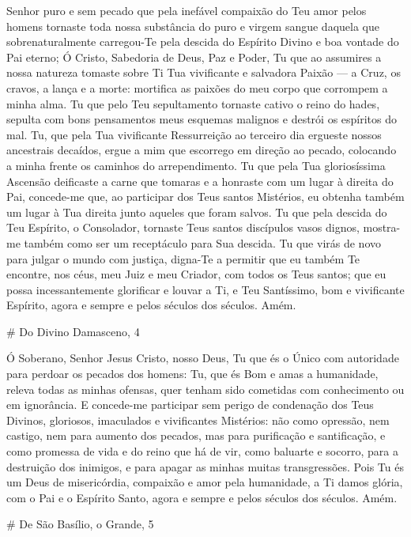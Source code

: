 \documentclass{subfiles}
\begin{document}
Senhor puro e sem pecado que pela inefável compaixão do Teu amor
pelos homens tornaste toda nossa substância do puro e virgem sangue
daquela que sobrenaturalmente carregou-Te pela descida do Espírito Divino e
boa vontade do Pai eterno; Ó Cristo, Sabedoria de Deus, Paz e Poder, Tu que
ao assumires a nossa natureza tomaste sobre Ti Tua vivificante e salvadora
Paixão — a Cruz, os cravos, a lança e a morte: mortifica as paixões do meu
corpo que corrompem a minha alma. Tu que pelo Teu sepultamento tornaste
cativo o reino do hades, sepulta com bons pensamentos meus esquemas
malignos e destrói os espíritos do mal. Tu, que pela Tua vivificante
Ressurreição ao terceiro dia ergueste nossos ancestrais decaídos, ergue a mim
que escorrego em direção ao pecado, colocando a minha frente os caminhos
do arrependimento. Tu que pela Tua gloriosíssima Ascensão deificaste a carne
que tomaras e a honraste com um lugar à direita do Pai, concede-me que, ao
participar dos Teus santos Mistérios, eu obtenha também um lugar à Tua
direita junto aqueles que foram salvos. Tu que pela descida do Teu Espírito, o
Consolador, tornaste Teus santos discípulos vasos dignos, mostra-me também
como ser um receptáculo para Sua descida. Tu que virás de novo para julgar o
mundo com justiça, digna-Te a permitir que eu também Te encontre, nos céus,
meu Juiz e meu Criador, com todos os Teus santos; que eu possa
incessantemente glorificar e louvar a Ti, e Teu Santíssimo, bom e vivificante
Espírito, agora e sempre e pelos séculos dos séculos. Amém.

# Do Divino Damasceno, 4

Ó Soberano, Senhor Jesus Cristo, nosso Deus, Tu que és o Único com autoridade
para perdoar os pecados dos homens: Tu, que és Bom e amas a humanidade, releva
todas as minhas ofensas, quer tenham sido cometidas com conhecimento ou em
ignorância. E concede-me participar sem perigo de condenação dos Teus Divinos,
gloriosos, imaculados e vivificantes Mistérios: não como opressão, nem castigo,
nem para aumento dos pecados, mas para purificação e santificação, e como
promessa de vida e do reino que há de vir, como baluarte e socorro, para a
destruição dos inimigos, e para apagar as minhas muitas transgressões. Pois Tu
és um Deus de misericórdia, compaixão e amor pela humanidade, a Ti damos glória,
com o Pai e o Espírito Santo, agora e sempre e pelos séculos dos séculos. Amém.

# De São Basílio, o Grande, 5
\end{document}
